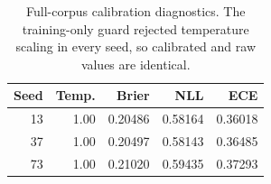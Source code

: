 \begin{table}[H]
\centering
\caption{Full-corpus calibration diagnostics. The training-only guard rejected temperature scaling in every seed, so calibrated and raw values are identical.}
\label{tab:full-corpus-calibration}
\small
\setlength{\tabcolsep}{5pt}
\begin{tabular}{@{}rrrrr@{}}
\toprule
Seed & Temp. & Brier & NLL & ECE \\
\midrule
13 & 1.00 & 0.20486 & 0.58164 & 0.36018 \\
37 & 1.00 & 0.20497 & 0.58143 & 0.36485 \\
73 & 1.00 & 0.21020 & 0.59435 & 0.37293 \\
\bottomrule
\end{tabular}
\end{table}
